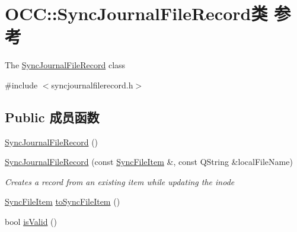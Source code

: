 \hypertarget{class_o_c_c_1_1_sync_journal_file_record}{}\section{O\+CC\+:\+:Sync\+Journal\+File\+Record类 参考}
\label{class_o_c_c_1_1_sync_journal_file_record}


The \hyperlink{class_o_c_c_1_1_sync_journal_file_record}{Sync\+Journal\+File\+Record} class  




{\ttfamily \#include $<$syncjournalfilerecord.\+h$>$}

\subsection*{Public 成员函数}
\begin{DoxyCompactItemize}
\item 
\hyperlink{class_o_c_c_1_1_sync_journal_file_record_a5da6ec37c0c92ba71e5a594497072c65}{Sync\+Journal\+File\+Record} ()
\item 
\hyperlink{class_o_c_c_1_1_sync_journal_file_record_a3763d984b09b646b55e278d78057ce62}{Sync\+Journal\+File\+Record} (const \hyperlink{class_o_c_c_1_1_sync_file_item}{Sync\+File\+Item} \&, const Q\+String \&local\+File\+Name)
\begin{DoxyCompactList}\small\item\em Creates a record from an existing item while updating the inode \end{DoxyCompactList}\item 
\hyperlink{class_o_c_c_1_1_sync_file_item}{Sync\+File\+Item} \hyperlink{class_o_c_c_1_1_sync_journal_file_record_a64135685550c37c21aa134fdf3cb8c1f}{to\+Sync\+File\+Item} ()
\item 
bool \hyperlink{class_o_c_c_1_1_sync_journal_file_record_a7d81643e14103416a460474caa60a194}{is\+Valid} ()
\end{DoxyCompactItemize}
